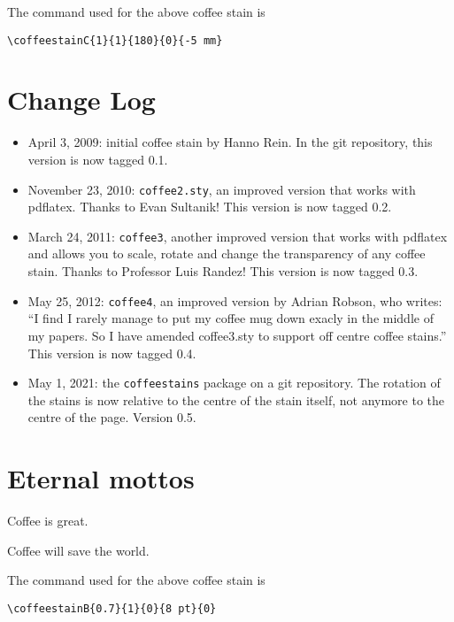 \documentclass[a4paper, 11pt, BCOR = 0 pt, oneside, english]{scrartcl}
\begin{document}
\vfill{}

\begin{tcolorbox}
  The command used for the above coffee stain is

  \verb|\coffeestainC{1}{1}{180}{0}{-5 mm}|
\end{tcolorbox}
\newpage{}
\section{Change Log}
\begin{itemize}
\item April 3, 2009: initial coffee stain by Hanno Rein. In the git repository,
  this version is now tagged 0.1.
\item November 23, 2010: \texttt{coffee2.sty}, an improved version that works
  with pdflatex. Thanks to Evan Sultanik! This version is now tagged 0.2.
\item March 24, 2011: \texttt{coffee3}, another improved version that works
  with pdflatex and allows you to scale, rotate and change the transparency of
  any coffee stain. Thanks to Professor Luis Randez! This version is now tagged
  0.3.
\item May 25, 2012: \texttt{coffee4}, an improved version by Adrian Robson, who
  writes: “I find I rarely manage to put my coffee mug down exacly in the middle
  of my papers.  So I have amended coffee3.sty to support off centre coffee
  stains.” This version is now tagged 0.4.
\item May 1, 2021: the \texttt{coffeestains} package on a git
  repository. The rotation of the stains is now relative to the centre of the
  stain itself, not anymore to the centre of the page. Version 0.5.
\end{itemize}

\label{stainB}

\section{Eternal mottos}

Coffee is great.

\vspace{5mm}

\noindent
Coffee will save the world.

\vfill{}

\begin{tcolorbox}
  The command used for the above coffee stain is

  \verb|\coffeestainB{0.7}{1}{0}{8 pt}{0}|
\end{tcolorbox}
\end{document}
